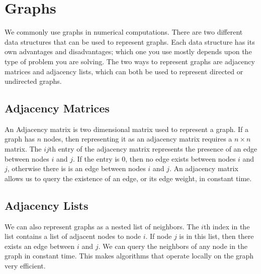 \label{lab:SixDegreesKevinBacon}


\section*{Graphs}
We commonly use graphs in numerical computations.
There are two different data structures that can be used to represent graphs.
Each data structure has its own advantages and disadvantages;
which one you use mostly depends upon the type of problem you are solving.
The two ways to represent graphs are adjacency matrices and adjacency lists, which can both be used to represent directed or undirected graphs.

\subsection*{Adjacency Matrices}
An Adjacency matrix is two dimensional matrix used to represent a graph.
If a graph has $n$ nodes, then representing it as an adjacency matrix requires a $n \times n$ matrix.
The $ij$th entry of the adjacency matrix represents the presence of an edge between nodes $i$ and $j$.
If the entry is 0, then no edge exists between nodes $i$ and $j$, otherwise there is is an edge between nodes $i$ and $j$.
An adjacency matrix allows us to query the existence of an edge, or its edge weight, in constant time.

\subsection*{Adjacency Lists}
We can also represent graphs as a nested list of neighbors.
The $i$th index in the list contains a list of adjacent nodes to node $i$.
If node $j$ is in this list, then there exists an edge between $i$ and $j$.
We can query the neighbors of any node in the graph in constant time.
This makes algorithms that operate locally on the graph very efficient.

